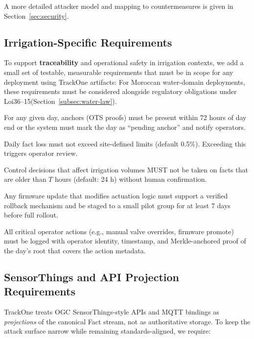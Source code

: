 A more detailed attacker model and mapping to countermeasures is given in Section~\ref{sec:security}.

\subsection{Irrigation-Specific Requirements}\label{subsec:irrigation-specific-requirements}
To support \textbf{traceability} and operational safety in irrigation contexts, we add a small set of testable, measurable requirements that must be in scope for any deployment using TrackOne artifacts:
For Moroccan water-domain deployments, these requirements must be considered alongside regulatory obligations under Loi36--15(Section~\ref{subsec:water-law}).

\begin{description}[style=nextline]
  \item[R-1 Maximum anchoring delay] For any given day, anchors (\ac{OTS} proofs) must be present within 72 hours of day end or the system must mark the day as ``pending anchor'' and notify operators.
  \item[R-2 Maximum tolerable data loss] Daily fact loss must not exceed site-defined limits (default 0.5\%). Exceeding this triggers operator review.
  \item[R-3 Sampling \& action separation] Control decisions that affect irrigation volumes MUST not be taken on facts that are older than $T$ hours (default: 24 h) without human confirmation.
  \item[R-4 Update rollback] Any firmware update that modifies actuation logic must support a verified rollback mechanism and be staged to a small pilot group for at least 7 days before full rollout.
  \item[R-5 Auditability] All critical operator actions (e.g., manual valve overrides, firmware promote) must be logged with operator identity, timestamp, and Merkle-anchored proof of the day's root that covers the action metadata.
\end{description}

\subsection{SensorThings and API Projection Requirements}\label{subsec:sensorthings-and-api-projection-requirements}
TrackOne treats \ac{OGC} SensorThings-style \ac{API}s and MQTT bindings as \emph{projections} of the canonical Fact stream, not
as authoritative storage.
To keep the attack surface narrow while remaining standards-aligned, we require:

